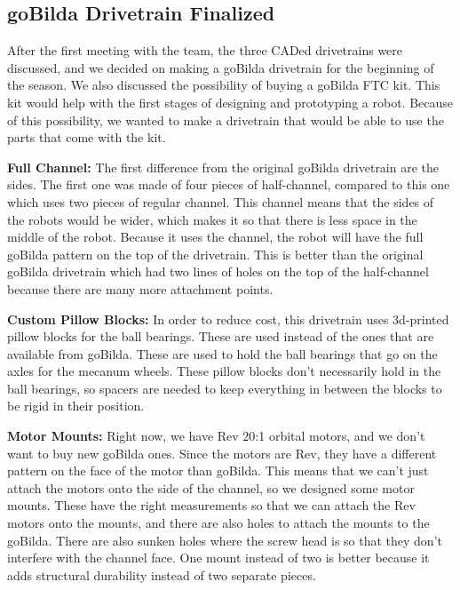 

\subsection{goBilda Drivetrain Finalized}


\par After the first meeting with the team, the three CADed drivetrains were discussed, and we decided on making a goBilda drivetrain for the beginning of the season. We also discussed the possibility of buying a goBilda FTC kit. This kit would help with the first stages of designing and prototyping a robot. Because of this possibility, we wanted to make a drivetrain that would be able to use the parts that come with the kit.


\par \textbf{Full Channel:} The first difference from the original goBilda drivetrain are the sides. The first one was made of four pieces of half-channel, compared to this one which uses two pieces of regular channel. This channel means that the sides of the robots would be wider, which makes it so that there is less space in the middle of the robot. Because it uses the channel, the robot will have the full goBilda pattern on the top of the drivetrain. This is better than the original goBilda drivetrain which had two lines of holes on the top of the half-channel because there are many more attachment points.

\newpage


\par \textbf{Custom Pillow Blocks:} In order to reduce cost, this drivetrain uses 3d-printed pillow blocks for the ball bearings. These are used instead of the ones that are available from goBilda. These are used to hold the ball bearings that go on the axles for the mecanum wheels. These pillow blocks don't necessarily hold in the ball bearings, so spacers are needed to keep everything in between the blocks to be rigid in their position.


\par \textbf{Motor Mounts:} Right now, we have Rev 20:1 orbital motors, and we don't want to buy new goBilda ones. Since the motors are Rev, they have a different pattern on the face of the motor than goBilda. This means that we can't just attach the motors onto the side of the channel, so we designed some motor mounts. These have the right measurements so that we can attach the Rev motors onto the mounts, and there are also holes to attach the mounts to the goBilda. There are also sunken holes where the screw head is so that they don't interfere with the channel face. One mount instead of two is better because it adds structural durability instead of two separate pieces.

